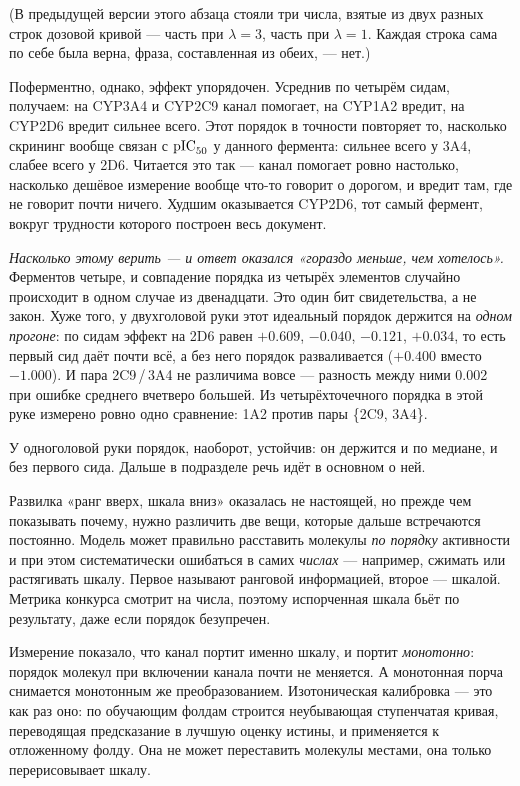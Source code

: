 (В предыдущей версии этого абзаца стояли три числа, взятые из двух разных строк дозовой
кривой --- часть при $\lambda = 3$, часть при $\lambda = 1$. Каждая строка сама по себе была
верна, фраза, составленная из обеих, --- нет.)

Поферментно, однако, эффект упорядочен. Усреднив по четырём сидам,
получаем: на CYP3A4 и CYP2C9 канал помогает, на CYP1A2 вредит, на CYP2D6 вредит сильнее
всего. Этот порядок в точности повторяет то, насколько скрининг вообще связан с $\mathrm{pIC}_{50}$ у
данного фермента: сильнее всего у 3A4, слабее всего у 2D6. Читается это так --- канал
помогает ровно настолько, насколько дешёвое измерение вообще что-то говорит о дорогом, и
вредит там, где не говорит почти ничего. Худшим оказывается CYP2D6, тот самый фермент,
вокруг трудности которого построен весь документ.

\emph{Насколько этому верить --- и ответ оказался «гораздо меньше, чем хотелось».} Ферментов
четыре, и совпадение порядка из четырёх элементов случайно происходит в одном случае из
двенадцати. Это один бит свидетельства, а не закон. Хуже того, у двухголовой руки этот
идеальный порядок держится на \emph{одном прогоне}: по сидам эффект на 2D6 равен
$+0.609$, $-0.040$, $-0.121$, $+0.034$, то есть первый сид даёт почти всё, а без него порядок
разваливается ($+0.400$ вместо $-1.000$). И пара 2C9\,/\,3A4 не различима вовсе --- разность
между ними 0.002 при ошибке среднего вчетверо большей. Из четырёхточечного порядка в этой
руке измерено ровно одно сравнение: 1A2 против пары \{2C9, 3A4\}.

У одноголовой руки порядок, наоборот, устойчив: он держится и по медиане, и без первого
сида. Дальше в подразделе речь идёт в основном о ней.

Развилка «ранг вверх, шкала вниз» оказалась не настоящей, но прежде чем показывать почему,
нужно различить две
вещи, которые дальше встречаются постоянно. Модель может правильно расставить молекулы
\emph{по порядку} активности и при этом систематически ошибаться в самих \emph{числах} ---
например, сжимать или растягивать шкалу. Первое называют ранговой информацией, второе ---
шкалой. Метрика конкурса смотрит на числа, поэтому испорченная шкала бьёт по результату, даже
если порядок безупречен.

Измерение показало, что канал портит именно шкалу, и портит \emph{монотонно}: порядок молекул
при включении канала почти не меняется. А монотонная порча снимается монотонным же
преобразованием. Изотоническая калибровка --- это как раз оно: по обучающим фолдам строится
неубывающая ступенчатая кривая, переводящая предсказание в лучшую оценку истины, и
применяется к отложенному фолду. Она не может переставить молекулы местами, она только
перерисовывает шкалу.

